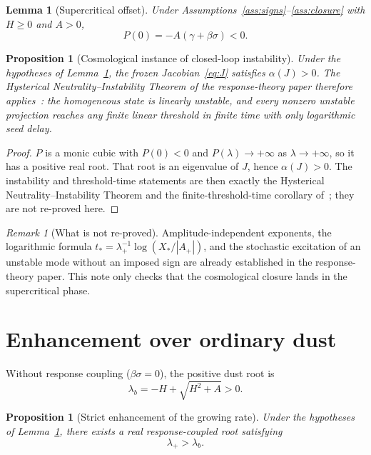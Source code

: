 \documentclass[11pt]{article}
\newtheorem{lemma}[theorem]{Lemma}
\newtheorem{proposition}[theorem]{Proposition}
\theoremstyle{definition}
\theoremstyle{remark}
\newtheorem{remark}[theorem]{Remark}
\begin{document}
\begin{lemma}[Supercritical offset]
\label{lem:P0}
Under Assumptions~\ref{ass:signs}--\ref{ass:closure} with $H\ge0$ and $A>0$,
\begin{equation}
P(0)=-A(\gamma+\beta\sigma)<0.
\end{equation}
\end{lemma}

\begin{proposition}[Cosmological instance of closed-loop instability]
\label{prop:instance}
Under the hypotheses of Lemma~\ref{lem:P0}, the frozen Jacobian~\eqref{eq:J} satisfies $\alpha(J)>0$.
The Hysterical Neutrality--Instability Theorem of the response-theory paper therefore applies~\cite{boyd2026response}: the homogeneous state is linearly unstable, and every nonzero unstable projection reaches any finite linear threshold in finite time with only logarithmic seed delay.
\end{proposition}

\begin{proof}
$P$ is a monic cubic with $P(0)<0$ and $P(\lambda)\to+\infty$ as $\lambda\to+\infty$, so it has a positive real root.
That root is an eigenvalue of $J$, hence $\alpha(J)>0$.
The instability and threshold-time statements are then exactly the Hysterical Neutrality--Instability Theorem and the finite-threshold-time corollary of~\cite{boyd2026response}; they are not re-proved here.
\end{proof}

\begin{remark}[What is not re-proved]
Amplitude-independent exponents, the logarithmic formula $t_*=\lambda_+^{-1}\log(X_*/|A_+|)$, and the stochastic excitation of an unstable mode without an imposed sign are already established in the response-theory paper.
This note only checks that the cosmological closure lands in the supercritical phase.
\end{remark}

\section{Enhancement over ordinary dust}
\label{sec:enhancement}
Without response coupling ($\beta\sigma=0$), the positive dust root is
\begin{equation}
\lambda_b=-H+\sqrt{H^2+A}>0.
\end{equation}

\begin{proposition}[Strict enhancement of the growing rate]
\label{prop:enhancement}
Under the hypotheses of Lemma~\ref{lem:P0}, there exists a real response-coupled root satisfying
\begin{equation}
\boxed{\lambda_+>\lambda_b.}
\end{equation}
\end{proposition}
\end{document}
